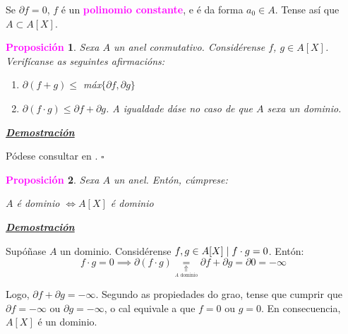 \documentclass[twoside]{report}
\newcommand{\magbf}[1]{\textcolor{magenta}{\textbf{#1}}} %
\theoremstyle{mystyle}
\newtheorem{prop}{\magbf{Proposición}}[chapter]
\newenvironment{proposition}
{\begin{mdframed}[linecolor = magenta,backgroundcolor = classicrose, linewidth = 2mm]\begin{prop}}
{\end{prop}\end{mdframed}}
\begin{document}
\noindent Se $\partial f = 0$, $f$ é un \magbf{polinomio constante}, e é da forma $a_{0} \in A$. Tense así que $A \subset A[X]$.\\

\begin{proposition} \label{prop2.17}
Sexa $A$ un anel conmutativo. Considérense $f$, $g \in A[X]$. Verifícanse as seguintes afirmacións:
\begin{enumerate}
    \item $\partial (f+g) \leq$ máx$\{\partial f, \partial g\}$ 
    \item $\partial (f \cdot g) \leq \partial f + \partial g$. A igualdade dáse no caso de que $A$ sexa un dominio.
\end{enumerate}
\end{proposition}

\vspace{2mm}

\noindent \textbf{\textit{\underline{Demostración}}}

\vspace{2mm}

\noindent Pódese consultar en \cite{hartley}. $\square$\\ 

\begin{proposition} \label{prop2.18}
Sexa $A$ un anel. Entón, cúmprese:
\begin{center}
    $A$ é dominio $ \Longleftrightarrow A[X]$ é dominio  
\end{center}
\end{proposition}

\vspace{2mm}

\noindent \textbf{\textit{\underline{Demostración}}}

\vspace{2mm}

\noindent {} Supóñase $A$ un dominio. Considérense $f,g \in A[X] \hspace{1mm} | \hspace{1mm} f \cdot g = 0$. Entón:
$$f \cdot g = 0 \implies \partial (f \cdot g) \underset{\underset{A \text{ dominio}}{\Uparrow}}{=} \partial f + \partial g = \partial 0 = -\infty$$

\noindent Logo, $\partial f + \partial g = -\infty$. Segundo as propiedades do grao, tense que cumprir que $\partial f = -\infty$ ou $\partial g = -\infty$, o cal equivale a que $f = 0$ ou $g = 0$. En consecuencia, $A[X]$ é un dominio.\\
\end{document}
